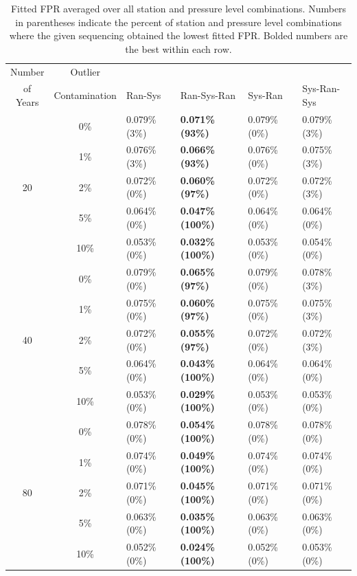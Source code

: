 \documentclass[12pt]{article}
\begin{document}
\begin{landscape}
\begin{table}[ht]
	\centering
	\begin{tabular}{cc|llll}
		\hline
		Number & Outlier & & & &\\ 
		of Years & Contamination & Ran-Sys & Ran-Sys-Ran & Sys-Ran & Sys-Ran-Sys\\ 
		\hline
		& 0\% & 0.079\% (3\%) & \textbf{0.071\% (93\%)} & 0.079\% (0\%) & 0.079\% (3\%) \\ 
		& 1\% & 0.076\% (3\%) & \textbf{0.066\% (93\%)} & 0.076\% (0\%) & 0.075\% (3\%) \\ 
		20 & 2\% & 0.072\% (0\%) & \textbf{0.060\% (97\%)} & 0.072\% (0\%) & 0.072\% (3\%) \\ 
		& 5\% & 0.064\% (0\%) & \textbf{0.047\% (100\%)} & 0.064\% (0\%) & 0.064\% (0\%) \\ 
		& 10\% & 0.053\% (0\%) & \textbf{0.032\% (100\%)} & 0.053\% (0\%) & 0.054\% (0\%) \\ 
		\hline
		& 0\% & 0.079\% (0\%) & \textbf{0.065\% (97\%)} & 0.079\% (0\%) & 0.078\% (3\%) \\ 
		& 1\% & 0.075\% (0\%) & \textbf{0.060\% (97\%)} & 0.075\% (0\%) & 0.075\% (3\%) \\ 
		40 & 2\% & 0.072\% (0\%) & \textbf{0.055\% (97\%)} & 0.072\% (0\%) & 0.072\% (3\%) \\ 
		& 5\% & 0.064\% (0\%) & \textbf{0.043\% (100\%)} & 0.064\% (0\%) & 0.064\% (0\%) \\ 
		& 10\% & 0.053\% (0\%) & \textbf{0.029\% (100\%)} & 0.053\% (0\%) & 0.053\% (0\%) \\ 
		\hline
		& 0\% & 0.078\% (0\%) & \textbf{0.054\% (100\%)} & 0.078\% (0\%) & 0.078\% (0\%) \\ 
		& 1\% & 0.074\% (0\%) & \textbf{0.049\% (100\%)} & 0.074\% (0\%) & 0.074\% (0\%) \\ 
		80 & 2\% & 0.071\% (0\%) & \textbf{0.045\% (100\%)} & 0.071\% (0\%) & 0.071\% (0\%) \\ 
		& 5\% & 0.063\% (0\%) & \textbf{0.035\% (100\%)} & 0.063\% (0\%) & 0.063\% (0\%) \\ 
		& 10\% & 0.052\% (0\%) & \textbf{0.024\% (100\%)} & 0.052\% (0\%) & 0.053\% (0\%) \\
		\hline
	\end{tabular}
	\caption{Fitted FPR averaged over all station and pressure level combinations.  Numbers in parentheses indicate the percent of station and pressure level combinations where the given sequencing obtained the lowest fitted FPR. Bolded numbers are the best within each row.}
	\label{tab:fitFPR}
\end{table}
\end{landscape}
\end{document}
